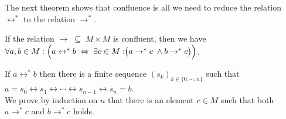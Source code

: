 The next theorem shows that confluence is all we need to reduce the relation $\leftrightarrow^*$
to the relation $\rightarrow^*$. 

\begin{Theorem}
  If the relation $\rightarrow \;\subseteq\; M \times M$ is confluent, then we have
  \\[0.2cm]
  \hspace*{1.3cm}
  $\forall a, b \in M:\Bigl( a \leftrightarrow^* b \;\Leftrightarrow\;
     \exists c \in M: \bigr(a \rightarrow^* c \;\wedge b \rightarrow^* c\bigr)\Bigr)$.
\end{Theorem}

\proof
If $a \leftrightarrow^* b$ then there is a finite sequence $(s_k)_{k\in \{0,\cdots,n\}}$ such that
\\[0.2cm]
\hspace*{1.3cm}
$a = s_0 \leftrightarrow s_1 \leftrightarrow \cdots \leftrightarrow s_{n-1} \leftrightarrow s_n = b$.
\\[0.2cm]
We prove by induction on $n$ that there is an element $c \in M$ such that both $a \rightarrow^* c$ and
$b \rightarrow^* c$ holds.
